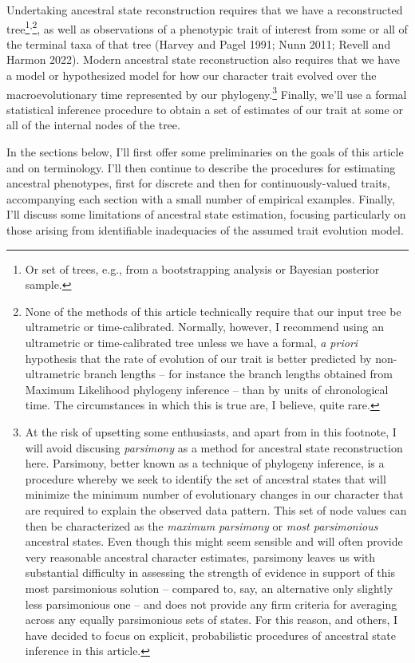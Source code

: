 \documentclass{article}
\begin{document}
Undertaking ancestral state reconstruction requires that we have a reconstructed tree\footnote{Or set of trees, e.g., from a bootstrapping analysis or Bayesian posterior sample.}\textsuperscript{,}\footnote{None of the methods of this article technically require that our input tree be ultrametric or time-calibrated. Normally, however, I recommend using an ultrametric or time-calibrated tree unless we have a formal, \emph{a priori} hypothesis that the rate of evolution of our trait is better predicted by non-ultrametric branch lengths -- for instance the branch lengths obtained from Maximum Likelihood phylogeny inference -- than by units of chronological time. The circumstances in which this is true are, I believe, quite rare.}, as well as observations of a phenotypic trait of interest from some or all of the terminal taxa of that tree (Harvey and Pagel 1991; Nunn 2011; Revell and Harmon 2022). Modern ancestral state reconstruction also requires that we have a model or hypothesized model for how our character trait evolved over the macroevolutionary time represented by our phylogeny.\footnote{At the risk of upsetting some enthusiasts, and apart from in this footnote, I will avoid discusing \emph{parsimony} as a method for ancestral state reconstruction here. Parsimony, better known as a technique of phylogeny inference, is a procedure whereby we seek to identify the set of ancestral states that will minimize the minimum number of evolutionary changes in our character that are required to explain the observed data pattern. This set of node values can then be characterized as the \emph{maximum parsimony} or \emph{most parsimonious} ancestral states. Even though this might seem sensible and will often provide very reasonable ancestral character estimates, parsimony leaves us with substantial difficulty in assessing the strength of evidence in support of this most parsimonious solution -- compared to, say, an alternative only slightly less parsimonious one -- and does not provide any firm criteria for averaging across any equally parsimonious sets of states. For this reason, and others, I have decided to focus on explicit, probabilistic procedures of ancestral state inference in this article.} Finally, we'll use a formal statistical inference procedure to obtain a set of estimates of our trait at some or all of the internal nodes of the tree.

In the sections below, I'll first offer some preliminaries on the goals of this article and on terminology. I'll then continue to describe the procedures for estimating ancestral phenotypes, first for discrete and then for continuously-valued traits, accompanying each section with a small number of empirical examples. Finally, I'll discuss some limitations of ancestral state estimation, focusing particularly on those arising from identifiable inadequacies of the assumed trait evolution model.
\end{document}
